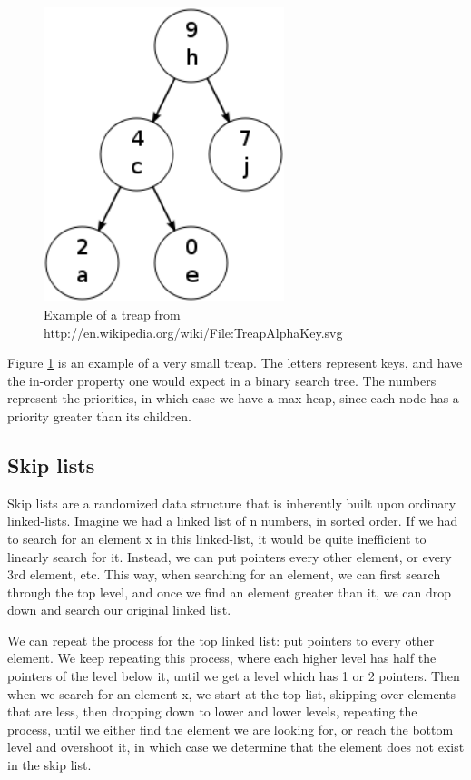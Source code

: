 \documentclass[oribibl]{llncs}
\begin{document}
\begin{figure}[here]
\center
\includegraphics[width=7cm]{treap}
\caption{Example of a treap from http://en.wikipedia.org/wiki/File:TreapAlphaKey.svg}
\label{fig:treap}
\end{figure}

Figure \ref{fig:treap} is an example of a very small treap. The letters represent keys, and have the in-order property one would expect in a binary search tree. The numbers represent the priorities, in which case we have a max-heap, since each node has a priority greater than its children.

\subsection{Skip lists}
Skip lists are a randomized data structure that is inherently built upon ordinary linked-lists. Imagine we had a linked list of n numbers, in sorted order. If we had to search for an element x in this linked-list, it would be quite inefficient to linearly search for it. Instead, we can put pointers every other element, or every 3rd element, etc. This way, when searching for an element, we can first search through the top level, and once we find an element greater than it, we can drop down and search our original linked list.

We can repeat the process for the top linked list: put pointers to every other element. We keep repeating this process, where each higher level has half the pointers of the level below it, until we get a level which has 1 or 2 pointers. Then when we search for an element x, we start at the top list, skipping over elements that are less, then dropping down to lower and lower levels, repeating the process, until we either find the element we are looking for, or reach the bottom level and overshoot it, in which case we determine that the element does not exist in the skip list.
\end{document}
